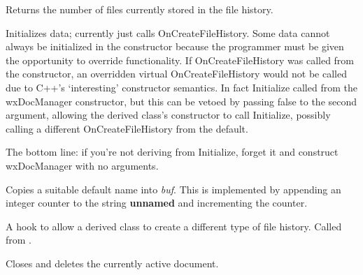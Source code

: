 \label{wxdocmanagergethistoryfilescount}


Returns the number of files currently stored in the file history.

\label{wxdocmanagerinitialize}


Initializes data; currently just calls OnCreateFileHistory. Some data cannot
always be initialized in the constructor because the programmer must be given
the opportunity to override functionality. If OnCreateFileHistory was called
from the constructor, an overridden virtual OnCreateFileHistory would not be
called due to C++'s `interesting' constructor semantics. In fact Initialize
 called from the wxDocManager constructor, but this can be
vetoed by passing false to the second argument, allowing the derived class's
constructor to call Initialize, possibly calling a different OnCreateFileHistory
from the default.

The bottom line: if you're not deriving from Initialize, forget it and
construct wxDocManager with no arguments.

\label{wxdocmanagermakedefaultname}


Copies a suitable default name into {\it buf}. This is implemented by
appending an integer counter to the string {\bf unnamed} and incrementing
the counter.


\label{wxdocmanageroncreatefilehistory}


A hook to allow a derived class to create a different type of file history. Called
from .

\label{wxdocmanageronfileclose}


Closes and deletes the currently active document.

